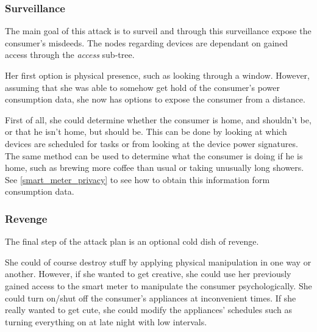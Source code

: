 \subsubsection{Surveillance}
The main goal of this attack is to surveil and through this surveillance expose the consumer's misdeeds.
The nodes regarding devices are dependant on gained access through the \textit{access} sub-tree.

Her first option is physical presence, such as looking through a window.
However, assuming that she was able to somehow get hold of the consumer's power consumption data, she now has options to expose the consumer from a distance.

First of all, she could determine whether the consumer is home, and shouldn't be, or that he isn't home, but should be.
This can be done by looking at which devices are scheduled for tasks or from looking at the device power signatures.
The same method can be used to determine what the consumer is doing if he is home, such as brewing more coffee than usual or taking unusually long showers.
See \cref{smart_meter_privacy} to see how to obtain this information form consumption data.

\subsubsection{Revenge}
The final step of the attack plan is an optional cold dish of revenge.

She could of course destroy stuff by applying physical manipulation in one way or another.
However, if she wanted to get creative, she could use her previously gained access to the smart meter to manipulate the consumer psychologically.
She could turn on/shut off the consumer's appliances at inconvenient times.
If she really wanted to get cute, she could modify the appliances' schedules such as turning everything on at late night with low intervals.
